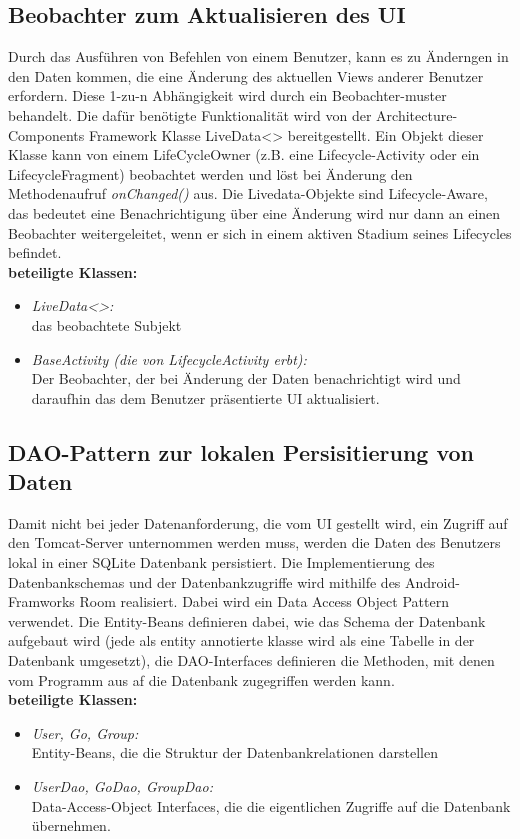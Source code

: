 \documentclass[11pt,a4paper]{report}
\begin{document}
\subsection{Beobachter zum Aktualisieren des UI}
Durch das Ausführen von Befehlen von einem Benutzer, kann es zu Änderngen in den Daten kommen, die eine Änderung des aktuellen Views anderer Benutzer erfordern. Diese 1-zu-n Abhängigkeit wird durch ein Beobachter-muster behandelt. Die dafür benötigte Funktionalität wird von der Architecture-Components Framework Klasse LiveData<> bereitgestellt. Ein Objekt dieser Klasse kann von einem LifeCycleOwner (z.B. eine Lifecycle-Activity oder ein LifecycleFragment) beobachtet werden und löst bei Änderung den Methodenaufruf \textit{onChanged()} aus. Die Livedata-Objekte sind Lifecycle-Aware, das bedeutet eine Benachrichtigung über eine Änderung wird nur dann an einen Beobachter weitergeleitet, wenn er sich in einem aktiven Stadium seines Lifecycles befindet.\\
\textbf{beteiligte Klassen:}
\begin{itemize}
	\item \textit{LiveData<>:}\\ das beobachtete Subjekt
	\item \textit{BaseActivity (die von LifecycleActivity erbt):}\\ Der Beobachter, der bei Änderung der Daten benachrichtigt wird und daraufhin das dem Benutzer präsentierte UI aktualisiert.
\end{itemize}

\subsection{DAO-Pattern zur lokalen Persisitierung von Daten}
Damit nicht bei jeder Datenanforderung, die vom UI gestellt wird, ein Zugriff auf den Tomcat-Server unternommen werden muss, werden die Daten des Benutzers lokal in einer SQLite Datenbank persistiert. Die Implementierung des Datenbankschemas und der Datenbankzugriffe wird mithilfe des Android-Framworks Room realisiert. Dabei wird ein Data Access Object Pattern verwendet.
Die Entity-Beans definieren dabei, wie das Schema der Datenbank aufgebaut wird (jede als entity annotierte klasse wird als eine Tabelle in der Datenbank umgesetzt), die DAO-Interfaces definieren die Methoden, mit denen vom Programm aus af die Datenbank zugegriffen werden kann.\\

\textbf{beteiligte Klassen:}
\begin{itemize}
	\item \textit{User, Go, Group:}\\ Entity-Beans, die die Struktur der Datenbankrelationen darstellen
	\item \textit{UserDao, GoDao, GroupDao:}\\ Data-Access-Object Interfaces, die die eigentlichen Zugriffe auf die Datenbank übernehmen.
\end{itemize}
\end{document}
